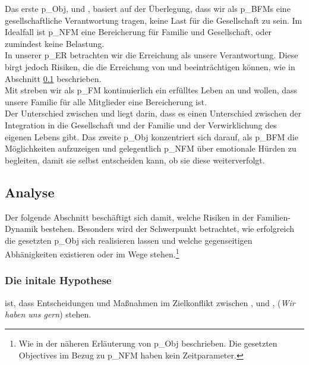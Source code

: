 Das erste \gls{p_Obj}, \NFMOOne und \NFMOTwo, basiert auf der Überlegung, dass wir als \glspl{p_BFM} eine gesellschaftliche Verantwortung tragen, keine Last für die Gesellschaft zu sein. Im Idealfall ist \gls{p_NFM} eine Bereicherung für Familie und Gesellschaft, oder zumindest keine Belastung.\\


In unserer \gls{p_ER} betrachten wir die Erreichung als unsere Verantwortung. Diese birgt jedoch Risiken, die die Erreichung von \NFMOTwo und \NFMOThree beeinträchtigen können, wie in Abschnitt \ref{sec:Risiko_EKB} beschrieben.\\


Mit \NFMOFour streben wir als \gls{p_FM} kontinuierlich ein erfülltes Leben an und wollen, dass unsere Familie für alle Mitglieder eine Bereicherung ist.\\


Der Unterschied zwischen \NFMOOne und \NFMOFour liegt darin, dass es einen Unterschied zwischen der Integration in die Gesellschaft und der Familie und der Verwirklichung des eigenen Lebens gibt. Das zweite \gls{p_Obj} konzentriert sich darauf, als \gls{p_BFM} die Möglichkeiten aufzuzeigen und gelegentlich \gls{p_NFM} über emotionale Hürden zu begleiten, damit sie selbst entscheiden kann, ob sie diese weiterverfolgt.

\subsection{Analyse} \label{sec:Risiko_EKB}
Der folgende Abschnitt beschäftigt sich damit, welche Risiken in der Familien-Dynamik bestehen. Besonders wird der Schwerpunkt betrachtet, wie erfolgreich die gesetzten \gls{p_Obj} sich realisieren lassen und welche gegenseitigen Abhänigkeiten existieren oder im Wege stehen.\footnote{
	Wie in der näheren Erläuterung von \gls{p_Obj} beschrieben. Die gesetzten Objectives im Bezug zu \gls{p_NFM} haben kein Zeitparameter.
}

\subsubsection{Die initale Hypothese} ist, dass Entscheidungen und Maßnahmen im Zielkonflikt zwischen \NFMOOne, \NFMOTwo und \NFMOThree, \NFMOFour (\textit{Wir haben uns gern}) stehen.\\


